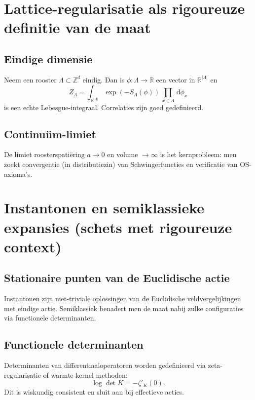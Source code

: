 \documentclass[11pt,a4paper,oneside]{book}
\theoremstyle{plain}
\theoremstyle{definition}
\newcommand{\R}{\mathbb{R}}
\newcommand{\Z}{\mathbb{Z}}
\renewcommand{\dd}{\,\mathrm{d}}
\begin{document}
	\chapter{Lattice-regularisatie als rigoureuze definitie van de maat}
	
	\section{Eindige dimensie}
	Neem een rooster $\Lambda\subset \Z^d$ eindig. Dan is $\phi:\Lambda\to\R$ een vector in $\R^{|\Lambda|}$ en
	\[
	Z_\Lambda=\int_{\R^{|\Lambda|}} \exp(-S_\Lambda(\phi))\,\prod_{x\in\Lambda}\dd\phi_x
	\]
	is een echte Lebesgue-integraal. Correlaties zijn goed gedefinieerd.
	
	\section{Continuüm-limiet}
	De limiet roosterspatiëring $a\to 0$ en volume $\to\infty$ is het kernprobleem: men zoekt convergentie (in distributiezin)
	van Schwingerfuncties en verificatie van OS-axioma’s.
	
	\chapter{Instantonen en semiklassieke expansies (schets met rigoureuze context)}
	
	\section{Stationaire punten van de Euclidische actie}
	Instantonen zijn niet-triviale oplossingen van de Euclidische veldvergelijkingen met eindige actie.
	Semiklassiek benadert men de maat nabij zulke configuraties via functionele determinanten.
	
	\section{Functionele determinanten}
	Determinanten van differentiaaloperatoren worden gedefinieerd via zeta-regularisatie of warmte-kernel methoden:
	\[
	\log \det K = -\zeta'_K(0).
	\]
	Dit is wiskundig consistent en sluit aan bij effectieve acties.
	
	\appendix
\end{document}
